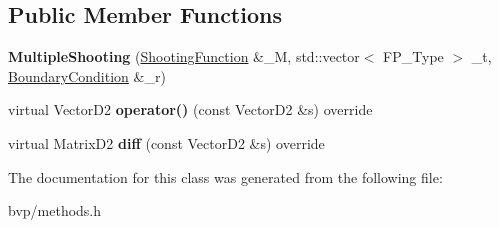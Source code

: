 \subsection*{Public Member Functions}
\begin{DoxyCompactItemize}
\item 
\mbox{\label{classMultipleShooting_a3a9dba24831825aca548c7f4e6e0f4f8}} 
{\bfseries Multiple\+Shooting} (\hyperlink{classShootingFunction}{Shooting\+Function} \&\+\_\+M, std\+::vector$<$ F\+P\+\_\+\+Type $>$ \+\_\+t, \hyperlink{classBoundaryCondition}{Boundary\+Condition} \&\+\_\+r)
\item 
\mbox{\label{classMultipleShooting_a1893112981f4f8e19a394413def8ddde}} 
virtual Vector\+D2 {\bfseries operator()} (const Vector\+D2 \&s) override
\item 
\mbox{\label{classMultipleShooting_a83febb68d789d4343811eb8ffa75bbf8}} 
virtual Matrix\+D2 {\bfseries diff} (const Vector\+D2 \&s) override
\end{DoxyCompactItemize}


The documentation for this class was generated from the following file\+:\begin{DoxyCompactItemize}
\item 
bvp/methods.\+h\end{DoxyCompactItemize}
